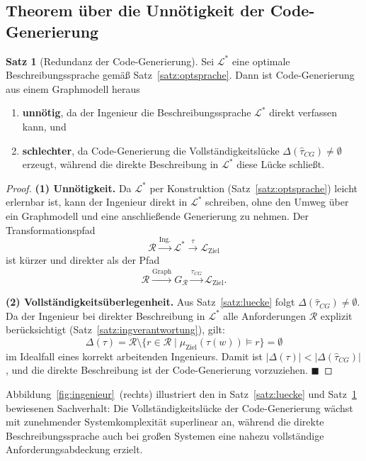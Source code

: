 ﻿\documentclass[a4paper,12pt]{article}
\theoremstyle{definition}
\newtheorem{satz}{Satz}
\begin{document}
\subsection{Theorem über die Unnötigkeit der Code-Generierung}

\begin{satz}[Redundanz der Code-Generierung]
\label{satz:codegen}
Sei $\mathcal{L}^*$ eine optimale Beschreibungssprache gemäß Satz~\ref{satz:optsprache}.
Dann ist Code-Generierung aus einem Graphmodell heraus
\begin{enumerate}
  \item \textbf{unnötig}, da der Ingenieur die Beschreibungssprache $\mathcal{L}^*$ direkt
        verfassen kann, und
  \item \textbf{schlechter}, da Code-Generierung die Vollständigkeitslücke
        $\Delta(\hat{\tau}_{CG}) \neq \emptyset$ erzeugt, während die direkte Beschreibung
        in $\mathcal{L}^*$ diese Lücke schließt.
\end{enumerate}
\end{satz}

\begin{proof}
\textbf{(1) Unnötigkeit.}
Da $\mathcal{L}^*$ per Konstruktion (Satz~\ref{satz:optsprache}) leicht erlernbar ist,
kann der Ingenieur direkt in $\mathcal{L}^*$ schreiben, ohne den Umweg über ein
Graphmodell und eine anschließende Generierung zu nehmen. Der Transformationspfad
\[
  \mathcal{R} \xrightarrow{\text{Ing.}} \mathcal{L}^* \xrightarrow{\tau} \mathcal{L}_{\text{Ziel}}
\]
ist kürzer und direkter als der Pfad
\[
  \mathcal{R} \xrightarrow{\text{Graph}} G_\mathcal{R} \xrightarrow{\hat{\tau}_{CG}} \mathcal{L}_{\text{Ziel}}.
\]

\textbf{(2) Vollständigkeitsüberlegenheit.}
Aus Satz~\ref{satz:luecke} folgt $\Delta(\hat{\tau}_{CG}) \neq \emptyset$.
Da der Ingenieur bei direkter Beschreibung in $\mathcal{L}^*$ alle Anforderungen
$\mathcal{R}$ explizit berücksichtigt (Satz~\ref{satz:ingverantwortung}), gilt:
\[
  \Delta(\tau) = \mathcal{R} \setminus \{r \in \mathcal{R} \mid \mu_{\text{Ziel}}(\tau(w)) \models r\}
  = \emptyset
\]
im Idealfall eines korrekt arbeitenden Ingenieurs.
Damit ist $|\Delta(\tau)| < |\Delta(\hat{\tau}_{CG})|$, und die direkte Beschreibung
ist der Code-Generierung vorzuziehen. $\blacksquare$
\end{proof}

Abbildung~\ref{fig:ingenieur}~(rechts) illustriert den in Satz~\ref{satz:luecke} und
Satz~\ref{satz:codegen} bewiesenen Sachverhalt: Die Vollständigkeitslücke der
Code-Generierung wächst mit zunehmender Systemkomplexität superlinear an, während
die direkte Beschreibungssprache auch bei großen Systemen eine nahezu vollständige
Anforderungsabdeckung erzielt.
\end{document}

